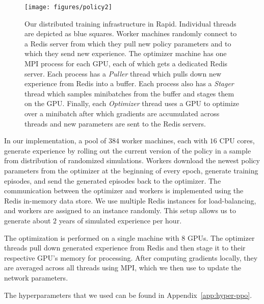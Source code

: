 \begin{figure}[h]
    \centering
    \texttt{[image: figures/policy2]}
    \caption{Our distributed training infrastructure in Rapid. Individual threads are depicted as blue squares. Worker machines randomly connect to a Redis server from which they pull new policy parameters and to which they send new experience. The optimizer machine has one MPI process for each GPU, each of which gets a dedicated Redis server. Each process has a \emph{Puller} thread which pulls down new experience from Redis into a buffer. Each process also has a \emph{Stager} thread which samples minibatches from the buffer and stages them on the GPU. Finally, each \emph{Optimizer} thread uses a GPU to optimize over a minibatch after which gradients are accumulated across threads and new parameters are sent to the Redis servers.}
    \label{fig:rapid}
\end{figure}

In our implementation, a pool of $384$ worker machines, each with $16$ CPU cores, generate experience by rolling out the current version of the policy in a sample from distribution of randomized simulations.
Workers download the newest policy parameters from the optimizer at the beginning of every epoch,
generate training episodes, and send the generated episodes back to the optimizer.
The communication between the optimizer and workers is implemented using the
Redis in-memory data store.
We use multiple Redis instances for load-balancing, and workers are assigned to an instance randomly.
This setup allows us to generate about $2$ years of simulated experience per hour.

The optimization is performed on a single machine with $8$ GPUs.
The optimizer threads pull down generated experience from Redis
and then stage it to their respective GPU's memory for processing.
After computing gradients locally, they are averaged across all threads using MPI, which we then use to update
the network parameters.

The hyperparameters that we used can be found in Appendix~\ref{app:hyper-ppo}.
